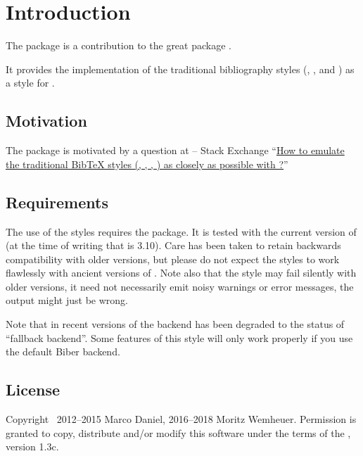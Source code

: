 \documentclass{ltxdockit}[2011/03/25]
\begin{document}
\printtitlepage
\tableofcontents


\section{Introduction}\label{sec:int}

The package  is a contribution to the great package .

It provides the implementation of the traditional bibliography styles (,
,  and ) as a style for .

\subsection{Motivation}\label{subsec:int:mot}

The package is motivated by a question at \tex{} -- \latex Stack Exchange
\enquote{\href{http://tex.stackexchange.com/a/69706/}{How to emulate the traditional BibTeX styles
(, , , ) as closely as possible with ?}}

\subsection{Requirements}
The use of the styles requires the  package.
It is tested with the current version of  (at the time of writing that is 3.10).
Care has been taken to retain backwards compatibility with older versions,
but please do not expect the styles to work flawlessly with ancient versions of .
Note also that the style may fail silently with older versions, it need not necessarily emit noisy
warnings or error messages, the output might just be wrong.

Note that in recent versions of  the \bibtex backend has been degraded to
the status of \enquote{fallback backend}.
Some features of this style will only work properly if you use the default Biber backend.

\subsection{License}

Copyright \textcopyright\ 2012--2015 Marco Daniel, 2016--2018 Moritz Wemheuer. Permission is granted to copy, distribute and\slash or modify this software under the terms of the \lppl, version 1.3c.
\end{document}
